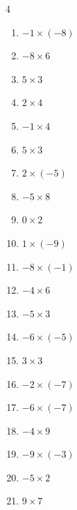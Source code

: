 \begin{multicols}{4}
\begin{enumerate}
  \item $-1\times (-8)$
        \phantom{$=8$}

  \item $-8\times 6$
        \phantom{$=-48$}

  \item $5\times 3$
        \phantom{$=15$}

  \item $2\times 4$
        \phantom{$=8$}

  \item $-1\times 4$
        \phantom{$=-4$}

  \item $5\times 3$
        \phantom{$=15$}

  \item $2\times (-5)$
        \phantom{$=-10$}

  \item $-5\times 8$
        \phantom{$=-40$}

  \item $0\times 2$
        \phantom{$=0$}

  \item $1\times (-9)$
        \phantom{$=-9$}

  \item $-8\times (-1)$
        \phantom{$=8$}

  \item $-4\times 6$
        \phantom{$=-24$}

  \item $-5\times 3$
        \phantom{$=-15$}

  \item $-6\times (-5)$
        \phantom{$=30$}

  \item $3\times 3$
        \phantom{$=9$}

  \item $-2\times (-7)$
        \phantom{$=14$}

  \item $-6\times (-7)$
        \phantom{$=42$}

  \item $-4\times 9$
        \phantom{$=-36$}

  \item $-9\times (-3)$
        \phantom{$=27$}

  \item $-5\times 2$
        \phantom{$=-10$}

  \item $9\times 7$
        \phantom{$=63$}


\end{enumerate}
\end{multicols}
